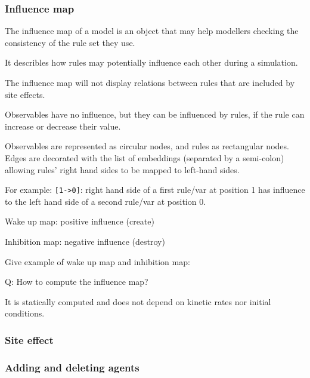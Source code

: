\documentclass{article}
\begin{document}
\subsubsection{Influence map}

The influence map of a model is an object that may help modellers checking
the consistency of the rule set they use.

It describles how rules may potentially influence each other during a
simulation.

The influence map will not display relations between rules that are
included by site effects.

Observables have no influence, but they can be influenced by rules, if the
rule can increase or decrease their value.

Observables are represented as circular nodes, and rules as rectangular
nodes. Edges are decorated with the list of embeddings (separated by a
semi-colon) allowing rules' right hand sides to be mapped to left-hand
sides.

For example: \verb|[1->0]|: right hand side of a first rule/var at position 1 has
influence to the left hand side of a second rule/var at position 0.

\begin{i}
\item Wake up map: positive influence (create)
\item Inhibition map: negative influence (destroy)
\end{i}

Give example of wake up map and inhibition map:

Q: How to compute the influence map?

It is statically computed and does not depend on kinetic rates nor initial
conditions.

\subsubsection{Site effect}

\subsubsection{Adding and deleting agents}


\end{document}
